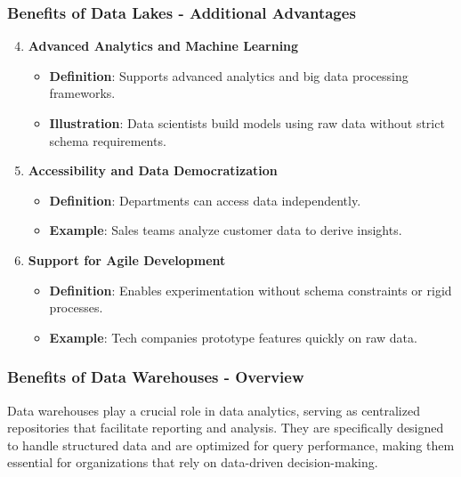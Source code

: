 \documentclass[aspectratio=169]{beamer}
\begin{document}
\begin{frame}[fragile]
    \frametitle{Benefits of Data Lakes - Additional Advantages}
    \begin{enumerate}
        \setcounter{enumi}{3} %
        \item \textbf{Advanced Analytics and Machine Learning}
            \begin{itemize}
                \item \textbf{Definition}: Supports advanced analytics and big data processing frameworks.
                \item \textbf{Illustration}: Data scientists build models using raw data without strict schema requirements.
            \end{itemize}

        \item \textbf{Accessibility and Data Democratization}
            \begin{itemize}
                \item \textbf{Definition}: Departments can access data independently.
                \item \textbf{Example}: Sales teams analyze customer data to derive insights.
            \end{itemize}

        \item \textbf{Support for Agile Development}
            \begin{itemize}
                \item \textbf{Definition}: Enables experimentation without schema constraints or rigid processes.
                \item \textbf{Example}: Tech companies prototype features quickly on raw data.
            \end{itemize}
    \end{enumerate}
\end{frame}

\begin{frame}[fragile]
    \frametitle{Benefits of Data Warehouses - Overview}
    Data warehouses play a crucial role in data analytics, serving as centralized repositories that facilitate reporting and analysis. They are specifically designed to handle structured data and are optimized for query performance, making them essential for organizations that rely on data-driven decision-making.
\end{frame}
\end{document}
